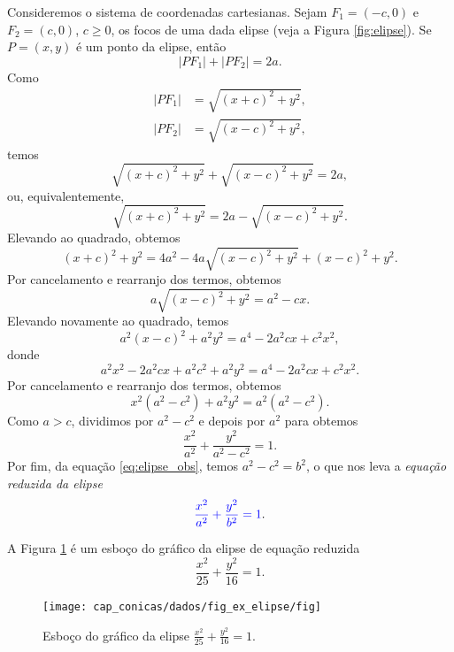 Consideremos o sistema de coordenadas cartesianas. Sejam $F_1=(-c,0)$ e $F_2=(c,0)$, $c\geq 0$, os focos de uma dada elipse (veja a Figura \ref{fig:elipse}).  Se $P=(x,y)$ é um ponto da elipse, então
\begin{equation}
  |PF_1| + |PF_2| = 2a.
\end{equation}
Como
\begin{align}
  |PF_1| &= \sqrt{(x+c)^2 + y^2}, \\
  |PF_2| &= \sqrt{(x-c)^2 + y^2},
\end{align}
temos
\begin{equation}
  \sqrt{(x+c)^2 + y^2} + \sqrt{(x-c)^2 + y^2} = 2a,
\end{equation}
ou, equivalentemente,
\begin{equation}
  \sqrt{(x+c)^2 + y^2} = 2a - \sqrt{(x-c)^2 + y^2}.
\end{equation}
Elevando ao quadrado, obtemos
\begin{equation}
  (x+c)^2 + y^2 = 4a^2 - 4a\sqrt{(x-c)^2+y^2} + (x-c)^2+y^2.
\end{equation}
Por cancelamento e rearranjo dos termos, obtemos
\begin{equation}
  a\sqrt{(x-c)^2+y^2}=a^2-cx.
\end{equation}
Elevando novamente ao quadrado, temos
\begin{equation}
  a^2(x-c)^2+a^2y^2=a^4-2a^2cx+c^2x^2,
\end{equation}
donde
\begin{equation}
  a^2x^2 -2a^2cx + a^2c^2 + a^2y^2= a^4 -2a^2cx + c^2x^2.
\end{equation}
Por cancelamento e rearranjo dos termos, obtemos
\begin{equation}
  x^2(a^2 - c^2) + a^2y^2 = a^2(a^2 - c^2).
\end{equation}
Como $a>c$, dividimos por $a^2-c^2$  e depois por $a^2$ para obtemos
\begin{equation}
  \frac{x^2}{a^2} + \frac{y^2}{a^2-c^2} = 1.
\end{equation}
Por fim, da equação \eqref{eq:elipse_obs}, temos $a^2-c^2 = b^2$, o que nos leva  a \emph{equação reduzida da elipse}
\begin{equation}
  {\color{blue}\frac{x^2}{a^2} + \frac{y^2}{b^2} = 1}.
\end{equation}

\begin{ex}
  A Figura \ref{fig:elipse_ex} é um esboço do gráfico da elipse de equação reduzida
  \begin{equation}
    \frac{x^2}{25} + \frac{y^2}{16} = 1.
  \end{equation}

  \begin{figure}[H]
    \centering
    \texttt{[image: cap\_conicas/dados/fig\_ex\_elipse/fig]}
    \caption{Esboço do gráfico da elipse $\displaystyle\frac{x^2}{25}+\frac{y^2}{16}=1$.}
    \label{fig:elipse_ex}
  \end{figure}
\end{ex}

